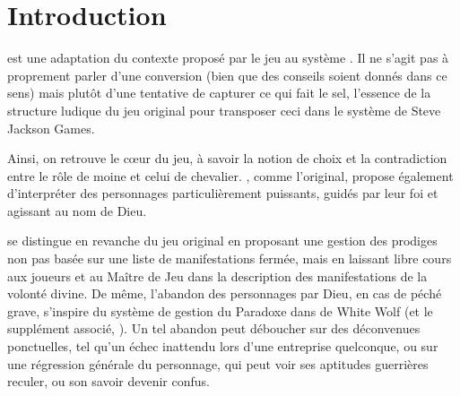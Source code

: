\chapter{Introduction}\label{chap:introduction} \gmc{} est une adaptation du
contexte proposé par le jeu  au système
. Il ne s'agit pas à proprement parler d'une conversion (bien
que des conseils soient donnés dans ce sens) mais plutôt d'une tentative de
capturer ce qui fait le sel, l'essence de la structure ludique du jeu original
pour transposer ceci dans le système de Steve Jackson Games.

Ainsi, on retrouve le cœur du jeu, à savoir la notion de choix et la
contradiction entre le rôle de moine et celui de chevalier. \gmc, comme
l'original, propose également d'interpréter des personnages particulièrement
puissants, guidés par leur foi et agissant au nom de Dieu.

\gmc{} se distingue en revanche du jeu original en proposant une gestion des
prodiges non pas basée sur une liste de manifestations fermée, mais en laissant
libre cours aux joueurs et au Maître de Jeu dans la description des
manifestations de la volonté divine. De même, l'abandon des personnages par
Dieu, en cas de péché grave, s'inspire du système de gestion du Paradoxe dans
 de White Wolf (et le supplément
 associé, ). Un tel
abandon peut déboucher sur des déconvenues ponctuelles, tel qu'un échec
inattendu lors d'une entreprise quelconque, ou sur une régression générale du
personnage, qui peut voir ses aptitudes guerrières reculer, ou son savoir
devenir confus.
